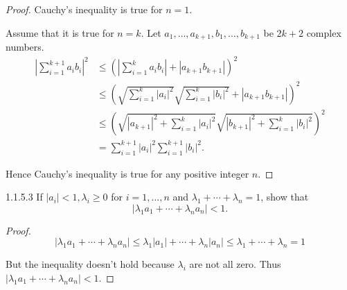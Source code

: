\begin{proof}
	Cauchy's inequality is true for \( n = 1 \).

	Assume that it is true for \( n = k \). Let \( a_{1}, \ldots, a_{k+1}, b_{1}, \ldots, b_{k+1} \) be \( 2k + 2 \) complex numbers.
	\begingroup
	\allowdisplaybreaks%
	\begin{align*}
		{\left\vert \sum^{k+1}_{i=1} a_{i}b_{i} \right\vert}^{2} & \le {\left(\left\vert \sum^{k}_{i=1} a_{i}b_{i} \right\vert + \left\vert a_{k+1}b_{k+1} \right\vert \right)}^{2}                                                                                                          \\
		                                                         & \le {\left( \sqrt{\sum^{k}_{i=1} {\left\vert a_{i} \right\vert}^{2}} \sqrt{\sum^{k}_{i=1} {\left\vert b_{i} \right\vert}^{2}} + \left\vert a_{k+1}b_{k+1} \right\vert \right)}^{2}                                        \\
		                                                         & \le {\left( \sqrt{ {\left\vert a_{k+1} \right\vert}^{2} + \sum^{k}_{i=1} {\left\vert a_{i} \right\vert}^{2}} \sqrt{{\left\vert b_{k+1} \right\vert}^{2} + \sum^{k}_{i=1} {\left\vert b_{i} \right\vert}^{2}} \right)}^{2} \\
		                                                         & = \sum^{k+1}_{i=1} {\left\vert a_{i} \right\vert}^{2} \sum^{k+1}_{i=1} {\left\vert b_{i} \right\vert}^{2}.
	\end{align*}
	\endgroup

	Hence Cauchy's inequality is true for any positive integer \( n \).
\end{proof}

\begin{problem}{1.1.5.3}
If \( \left\vert a_{i} \right\vert < 1, \lambda_{i} \ge 0 \) for \( i = 1, \ldots, n \) and \( \lambda_{1} + \cdots + \lambda_{n} = 1 \), show that
\[
	\left\vert \lambda_{1}a_{1} + \cdots + \lambda_{n}a_{n} \right\vert < 1.
\]
\end{problem}

\begin{proof}
	\[
		\left\vert \lambda_{1}a_{1} + \cdots + \lambda_{n}a_{n} \right\vert \le \lambda_{1} \left\vert a_{1} \right\vert + \cdots + \lambda_{n} \left\vert a_{n} \right\vert \le \lambda_{1} + \cdots + \lambda_{n} = 1
	\]

	But the inequality doesn't hold because \( \lambda_{i} \) are not all zero. Thus \( \left\vert \lambda_{1}a_{1} + \cdots + \lambda_{n}a_{n} \right\vert < 1 \).
\end{proof}

